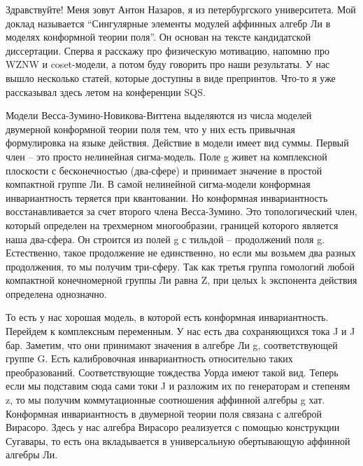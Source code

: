 \documentclass{article}
\theoremstyle{definition} \newtheorem{Def}{Определение}
\begin{document}
Здравствуйте! Меня зовут Антон Назаров, я из петербургского университета. Мой доклад называется ``Сингулярные элементы модулей аффинных алгебр Ли  в моделях конформной теории поля''. Он основан на тексте кандидатской диссертации. 
Сперва я расскажу про физическую мотивацию, напомню про WZNW и coset-модели, а потом буду говорить про наши результаты. У нас вышло несколько статей, которые доступны в виде препринтов. Что-то я уже рассказывал здесь летом на конференции SQS. 

Модели Весса-Зумино-Новикова-Виттена выделяются из числа моделей двумерной конформной теории поля тем, что у них есть привычная формулировка на языке действия. Действие в модели имеет вид суммы. Первый член -- это просто нелинейная сигма-модель. Поле g живет на комплексной плоскости с бесконечностью (два-сфере) и принимает значение в простой компактной группе Ли. 
В самой нелинейной сигма-модели конформная инвариантность теряется при квантовании. Но конформная инвариантность восстанавливается за счет второго члена Весса-Зумино. Это топологический член, который определен на трехмерном многообразии, границей которого является наша два-сфера. Он строится из полей g с тильдой -- продолжений поля g. Естественно, такое продолжение не единственно, но если мы возьмем два разных продолжения, то мы получим три-сферу. Так как третья группа гомологий любой компактной конечномерной группы Ли равна Z, при целых k экспонента действия определена однозначно. 

То есть у нас хорошая модель, в которой есть конформная инвариантность. Перейдем к комплексным переменным. У нас есть два сохраняющихся тока J и J бар. Заметим, что они принимают значения в алгебре Ли g, соответствующей группе G. Есть калибровочная инвариантность относительно таких преобразований. Соответствующие тождества Уорда имеют такой вид. Теперь если мы подставим сюда сами токи J и разложим их по генераторам и степеням z, то мы получим коммутационные соотношения аффинной алгебры g хат. 
Конформная инвариантность в двумерной теории поля связана с алгеброй Вирасоро. Здесь у нас алгебра Вирасоро реализуется с помощью конструкции Сугавары, то есть она вкладывается в универсальную обертывающую аффинной алгебры Ли.
\end{document}
